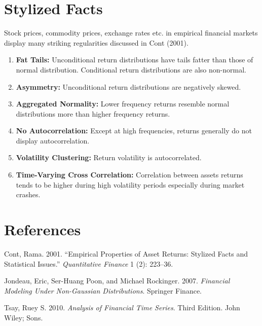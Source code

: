 \documentclass[11pt,]{article}
\providecommand{\tightlist}{%
  \setlength{\itemsep}{0pt}\setlength{\parskip}{0pt}}
\begin{document}
\section{Stylized Facts}\label{stylized-facts}

Stock prices, commodity prices, exchange rates etc. in empirical
financial markets display many striking regularities discussed in Cont
(2001).

\begin{enumerate}
\def\labelenumi{\arabic{enumi}.}
\tightlist
\item
  \textbf{Fat Tails:} Unconditional return distributions have tails
  fatter than those of normal distribution. Conditional return
  distributions are also non-normal.
\item
  \textbf{Asymmetry:} Unconditional return distributions are negatively
  skewed.
\item
  \textbf{Aggregated Normality:} Lower frequency returns resemble normal
  distributions more than higher frequency returns.
\item
  \textbf{No Autocorrelation:} Except at high frequencies, returns
  generally do not display autocorrelation.
\item
  \textbf{Volatility Clustering:} Return volatility is autocorrelated.
\item
  \textbf{Time-Varying Cross Correlation:} Correlation between assets
  returns tends to be higher during high volatility periods especially
  during market crashes.
\end{enumerate}

\section*{References}\label{references}

\hypertarget{refs}{}
\hypertarget{ref-Cont:2001}{}
Cont, Rama. 2001. ``Empirical Properties of Asset Returns: Stylized
Facts and Statistical Issues.'' \emph{Quantitative Finance} 1 (2):
223--36.

\hypertarget{ref-Jondeau_Poon_Rockinger:2007}{}
Jondeau, Eric, Ser-Huang Poon, and Michael Rockinger. 2007.
\emph{Financial Modeling Under Non-Gaussian Distributions}. Springer
Finance.

\hypertarget{ref-Tsay:2010}{}
Tsay, Ruey S. 2010. \emph{Analysis of Financial Time Series}. Third
Edition. John Wiley; Sons.
\end{document}
